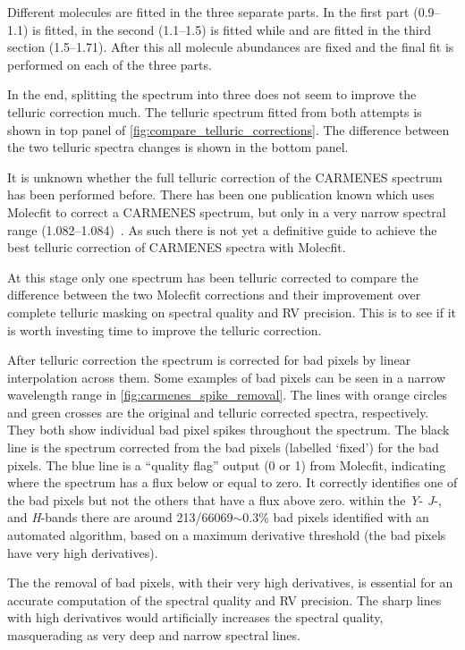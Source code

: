 Different molecules are fitted in the three separate parts.
In the first part (0.9--1.1\um{})  is fitted, in the second (1.1--1.5\um{})  is fitted while  and  are fitted in the third section (1.5--1.71\um{}).
After this all molecule abundances are fixed and the final fit is performed on each of the three parts.

In the end, splitting the spectrum into three does not seem to improve the telluric correction much.
The telluric spectrum fitted from both attempts is shown in top panel of \cref{fig:compare_telluric_corrections}.
The difference between the two telluric spectra changes is shown in the bottom panel.

It is unknown whether the full telluric correction of the {CARMENES} \nir{} spectrum has been performed before.
There has been one publication known which uses {Molecfit} to correct a {CARMENES} spectrum, but only in a very narrow spectral range (1.082--1.084\um{})~\citep{allard_spectrally_2018}.
As such there is not yet a definitive guide to achieve the best telluric correction of {CARMENES} spectra with {Molecfit}.

At this stage only one spectrum has been telluric corrected to compare the difference between the two {Molecfit} corrections and their improvement over complete telluric masking on spectral quality and {RV} precision.
This is to see if it is worth investing time to improve the telluric correction.

After telluric correction the spectrum is corrected for bad pixels by linear interpolation across them.
Some examples of bad pixels can be seen in a narrow wavelength range in \cref{fig:carmenes_spike_removal}.
The lines with orange circles and green crosses are the original and telluric corrected spectra, respectively.
They both show individual bad pixel spikes throughout the spectrum.
The black line is the spectrum corrected from  the bad pixels (labelled `fixed') for the bad pixels. 
The blue line is a ``quality flag'' output (0 or 1) from Molecfit, indicating where the spectrum has a flux below or equal to zero.
It correctly identifies one of the bad pixels but not the others that have a flux above zero.
within the \emph{Y}- \emph{J}-, and \emph{H}-bands there are around 213/66069\(\sim\)0.3\% bad pixels identified with an automated algorithm, based on a maximum derivative threshold (the bad pixels have very high derivatives).

The the removal of bad pixels, with their very high derivatives, is essential for an accurate computation of the spectral quality and RV precision. The sharp lines with high derivatives would artificially increases the spectral quality, masquerading as very deep and narrow spectral lines.


